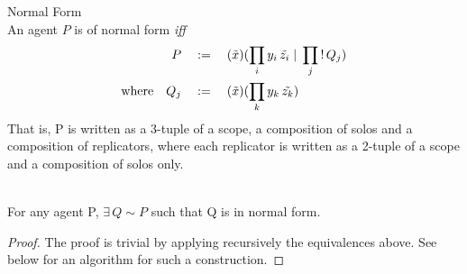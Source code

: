         \begin{definition}{Normal Form\\}
            An agent $P$ is of normal form \textit{iff}
            \begin{align*}
                                    P \quad &:= \quad (\tilde{x})(\prod_{i}{y_i \, \tilde{z_i}} \; | \; \prod_{j}{! \, Q_j}) \\
                \text{where} \quad Q_j \quad &:= \quad (\tilde{x})(\prod_{k}{y_k \, \tilde{z_k}})
            \end{align*}
            That is, P is written as a 3-tuple of a scope, a composition of solos and a composition of replicators, where each replicator is written as a 2-tuple of a scope and a composition of solos only.
        \end{definition}

        \begin{lemma}{~\\}
            For any agent P, $\exists \, Q \sim P$ such that Q is in normal form.
            \begin{proof}
                The proof is trivial by applying recursively the equivalences above.
                See below for an algorithm for such a construction.
            \end{proof}
        \end{lemma}

